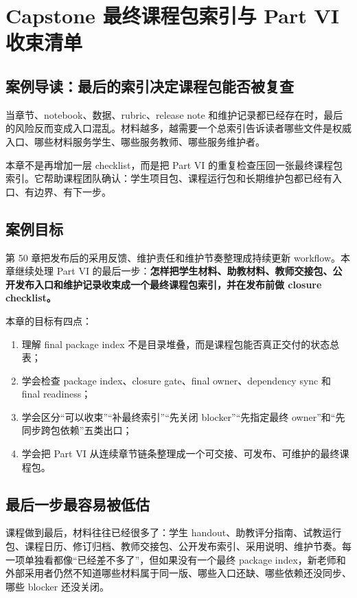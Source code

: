 \chapter{Capstone 最终课程包索引与 Part VI 收束清单}

\section{案例导读：最后的索引决定课程包能否被复查}

当章节、notebook、数据、rubric、release note 和维护记录都已经存在时，最后的风险反而变成入口混乱。材料越多，越需要一个总索引告诉读者哪些文件是权威入口、哪些材料服务学生、哪些服务教师、哪些服务维护者。

本章不是再增加一层 checklist，而是把 Part VI 的重复检查压回一张最终课程包索引。它帮助课程团队确认：学生项目包、课程运行包和长期维护包都已经有入口、有边界、有下一步。

\section{案例目标}

第 50 章把发布后的采用反馈、维护责任和维护节奏整理成持续更新 workflow。本章继续处理 Part VI 的最后一步：\textbf{怎样把学生材料、助教材料、教师交接包、公开发布入口和维护记录收束成一个最终课程包索引，并在发布前做 closure checklist。}

本章的目标有四点：

\begin{enumerate}
    \item 理解 final package index 不是目录堆叠，而是课程包能否真正交付的状态总表；
    \item 学会检查 package index、closure gate、final owner、dependency sync 和 final readiness；
    \item 学会区分“可以收束”“补最终索引”“先关闭 blocker”“先指定最终 owner”和“先同步跨包依赖”五类出口；
    \item 学会把 Part VI 从连续章节链条整理成一个可交接、可发布、可维护的最终课程包。
\end{enumerate}

\section{最后一步最容易被低估}

课程做到最后，材料往往已经很多了：学生 handout、助教评分指南、试教运行包、课程日历、修订归档、教师交接包、公开发布索引、采用说明、维护节奏。每一项单独看都像“已经差不多了”，但如果没有一个最终 package index，新老师和外部采用者仍然不知道哪些材料属于同一版、哪些入口还缺、哪些依赖还没同步、哪些 blocker 还没关闭。


